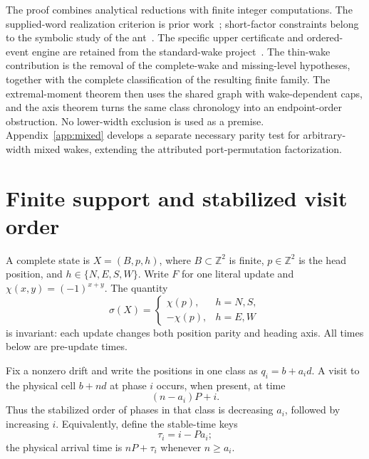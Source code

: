 \documentclass[11pt]{article}
\theoremstyle{definition}\newtheorem{definition}[theorem]{Definition}
\newcommand{\Z}{\mathbb Z}
\begin{document}
The proof combines analytical reductions with finite integer computations.
The supplied-word realization criterion is prior work~\cite[Section~3, ``Periodic-realisability criterion'']{Jillhewar2026};
short-factor constraints belong to the symbolic study of the ant~\cite{Gajardo2003}.
The specific upper certificate and ordered-event engine are retained from the
standard-wake project~\cite{KeStandard}. The thin-wake contribution is the removal
of the complete-wake and missing-level hypotheses, together with the complete
classification of the resulting finite family. The extremal-moment theorem
then uses the shared graph with wake-dependent caps, and the axis theorem
turns the same class chronology into an endpoint-order obstruction. No lower-width exclusion is
used as a premise. Appendix~\ref{app:mixed} develops a separate
necessary parity test for arbitrary-width mixed wakes, extending the attributed
port-permutation factorization.

\section{Finite support and stabilized visit order}\label{sec:chronology}
A complete state is $X=(B,p,h)$, where $B\subset\Z^2$ is finite, $p\in\Z^2$ is the head position, and
$h\in\{N,E,S,W\}$. Write $F$ for one literal update and
$\chi(x,y)=(-1)^{x+y}$. The quantity
\[
\sigma(X)=\begin{cases}\chi(p),&h=N,S,\\-\chi(p),&h=E,W\end{cases}
\]
is invariant: each update changes both position parity and heading axis.
All times below are pre-update times.

Fix a nonzero drift and write the positions in one class as $q_i=b+a_i d$.
A visit to the physical cell $b+n d$ at phase $i$ occurs, when present, at time
\[
(n-a_i)P+i.
\]
Thus the stabilized order of phases in that class is decreasing $a_i$, followed
by increasing $i$. Equivalently, define the stable-time keys
\begin{equation}\label{eq:stable-order}
 \tau_i=i-Pa_i;
\end{equation}
the physical arrival time is $nP+\tau_i$ whenever $n\ge a_i$.
\end{document}
